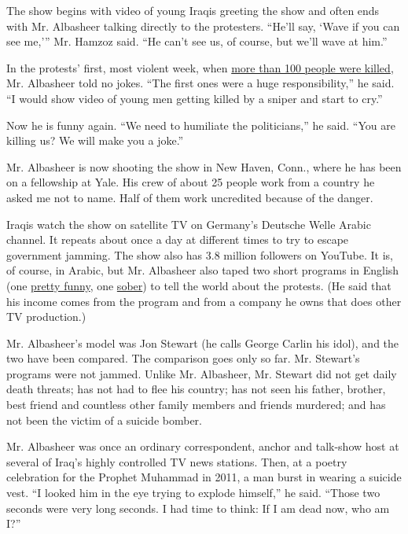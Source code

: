 The show begins with video of young Iraqis greeting the show and often
ends with Mr. Albasheer talking directly to the protesters. ``He'll say,
`Wave if you can see me,''' Mr. Hamzoz said. ``He can't see us, of
course, but we'll wave at him.''

In the protests' first, most violent week, when
\href{https://www.aljazeera.com/news/2019/10/iraq-abdul-mahdi-orders-probe-protester-deaths-191012152657389.html}{more
than 100 people were killed}, Mr. Albasheer told no jokes. ``The first
ones were a huge responsibility,'' he said. ``I would show video of
young men getting killed by a sniper and start to cry.''

Now he is funny again. ``We need to humiliate the politicians,'' he
said. ``You are killing us? We will make you a joke.''

Mr. Albasheer is now shooting the show in New Haven, Conn., where he has
been on a fellowship at Yale. His crew of about 25 people work from a
country he asked me not to name. Half of them work uncredited because of
the danger.

Iraqis watch the show on satellite TV on Germany's Deutsche Welle Arabic
channel. It repeats about once a day at different times to try to escape
government jamming. The show also has 3.8 million followers on YouTube.
It is, of course, in Arabic, but Mr. Albasheer also taped two short
programs in English (one
\href{https://www.youtube.com/watch?v=V-KVPWXWlNk}{pretty funny}, one
\href{https://www.youtube.com/watch?v=Lc0EOr_Rq_w}{sober}) to tell the
world about the protests. (He said that his income comes from the
program and from a company he owns that does other TV production.)

Mr. Albasheer's model was Jon Stewart (he calls George Carlin his idol),
and the two have been compared. The comparison goes only so far. Mr.
Stewart's programs were not jammed. Unlike Mr. Albasheer, Mr. Stewart
did not get daily death threats; has not had to flee his country; has
not seen his father, brother, best friend and countless other family
members and friends murdered; and has not been the victim of a suicide
bomber.

Mr. Albasheer was once an ordinary correspondent, anchor and talk-show
host at several of Iraq's highly controlled TV news stations. Then, at a
poetry celebration for the Prophet Muhammad in 2011, a man burst in
wearing a suicide vest. ``I looked him in the eye trying to explode
himself,'' he said. ``Those two seconds were very long seconds. I had
time to think: If I am dead now, who am I?''

